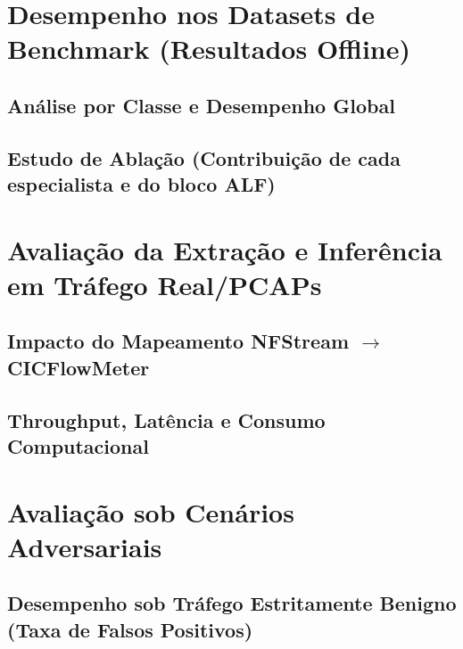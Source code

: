 \section{Desempenho nos Datasets de Benchmark (Resultados Offline)}
\label{sec:desempenho_benchmark}

\subsection{Análise por Classe e Desempenho Global}
\label{subsec:analise_classe_global}

\subsection{Estudo de Ablação (Contribuição de cada especialista e do bloco ALF)}
\label{subsec:estudo_ablacao}

\section{Avaliação da Extração e Inferência em Tráfego Real/PCAPs}
\label{sec:avaliacao_extracao_inferencia}

\subsection{Impacto do Mapeamento NFStream \texorpdfstring{$\to$}{->} CICFlowMeter}
\label{subsec:impacto_mapeamento}

\subsection{Throughput, Latência e Consumo Computacional}
\label{subsec:throughput_latencia_consumo}

\section{Avaliação sob Cenários Adversariais}
\label{sec:avaliacao_cenarios_adversariais}

\subsection{Desempenho sob Tráfego Estritamente Benigno (Taxa de Falsos Positivos)}
\label{subsec:desempenho_trafego_benigno}

